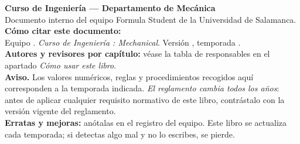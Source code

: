 \thispagestyle{empty}
\null\vfill
\noindent
\begin{minipage}{\textwidth}
\small
\textbf{Curso de Ingeniería \FUSAL{} --- Departamento de Mecánica}\\[0.4em]
Documento interno del equipo Formula Student de la Universidad de Salamanca.\\[0.8em]

\textbf{Cómo citar este documento:}\\
Equipo \FUSAL. \textit{Curso de Ingeniería \FUSAL: Mechanical}. Versión \version, temporada \temporada.\\[0.8em]

\textbf{Autores y revisores por capítulo:} véase la tabla de responsables en el
apartado \textit{Cómo usar este libro}.\\[0.8em]

\textbf{Aviso.} Los valores numéricos, reglas y procedimientos recogidos aquí
corresponden a la temporada indicada. \emph{El reglamento cambia todos los años}:
antes de aplicar cualquier requisito normativo de este libro, contrástalo con la
versión vigente del reglamento.\\[0.8em]

\textbf{Erratas y mejoras:} anótalas en el registro del equipo. Este libro se
actualiza cada temporada; si detectas algo mal y no lo escribes, se pierde.
\end{minipage}
\vspace{2cm}
\clearpage

